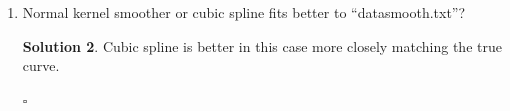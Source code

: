 \documentclass[twoside]{article}
\theoremstyle{definition}
\newtheorem*{solutionT}{Solution}
\newenvironment{solution}{\begin{cBox}\begin{solutionT}}{\hfill{\scriptsize\ensuremath{\square}}\end{solutionT}\end{cBox}}
\theoremstyle{definition}
\begin{document}
\begin{enumerate}
\begin{solution}
\begin{Schunk}
\begin{Soutput}
Smoothing Parameter  spar= 0.7581144  lambda= 0.0005645639 (13 iterations)
Equivalent Degrees of Freedom (Df): 11.27981
Penalized Criterion (RSS): 9036.802
PRESS(l.o.o. CV): 23.83662
\end{Soutput}
\end{Schunk}
Therefore the optimal bandwidth for the gaussian smoother is $0.303$ and the $0.76$ respectively. 
\end{solution}
\item Normal kernel smoother or cubic spline fits better to “datasmooth.txt”? 

\begin{solution}

Cubic spline is better in this case more closely matching the true curve.

\end{solution}
\end{enumerate}
\end{document}
